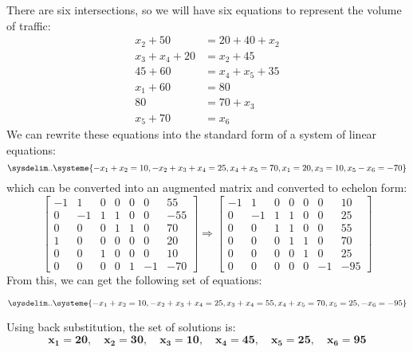 \documentclass[12pt]{article}
\begin{document}
\begin{solution}
There are six intersections, so we will have six equations to represent the volume of traffic:
\begin{align*}
x_2 + 50 &= 20 + 40 + x_2 \\
x_3 + x_4 + 20 &= x_2 + 45 \\
45 + 60 &= x_4 + x_5 + 35 \\
x_1 + 60 &= 80 \\
80 &= 70 + x_3 \\ 
x_5 + 70 &= x_6
\end{align*}
We can rewrite these equations into the standard form of a system of linear equations:
$$\sysdelim..\systeme{
  -x_1  + x_2                         = 10,
         -x_2 + x_3 + x_4             = 25,
                      x_4 + x_5       = 70,
   x_1                                = 20,
                x_3                   = 10,
                            x_5 - x_6 = -70
}$$
which can be converted into an augmented matrix and converted to echelon form:
$$\begin{bmatrix} -1 & 1 & 0 & 0 & 0 & 0 & 55 \\ 
				   0 & -1 & 1 & 1 & 0 & 0 & -55\\ 
				   0 & 0 & 0 & 1 & 1 & 0 & 70 \\
				   1 & 0 & 0 & 0 & 0 & 0 & 20 \\
				   0 & 0 & 1 & 0 & 0 & 0 & 10 \\
				   0 & 0 & 0 & 0 & 1 & -1 & -70
				   \end{bmatrix} \Rightarrow 
\begin{bmatrix}   -1 & 1 & 0 & 0 & 0 & 0 & 10 \\ 
				   0 & -1 & 1 & 1 & 0 & 0 & 25\\ 
				   0 & 0 & 1 & 1 & 0 & 0 & 55 \\
				   0 & 0 & 0 & 1 & 1 & 0 & 70 \\
				   0 & 0 & 0 & 0 & 1 & 0 & 25 \\
				   0 & 0 & 0 & 0 & 0 & -1 & -95
				   \end{bmatrix} $$
From this, we can get the following set of equations:

$$\sysdelim..\systeme{
  -x_1  + x_2                         = 10,
         -x_2 + x_3 + x_4             = 25,
                x_3 + x_4             = 55,
                      x_4 + x_5       = 70,
                            x_5       = 25,
                                 -x_6 = -95
}$$


Using back substitution, the set of solutions is: $$\mathbf{x_1 = 20, \quad x_2 = 30, \quad x_3 = 10, \quad x_4 = 45, \quad x_5 = 25, \quad x_6 = 95}$$
\end{solution}
\end{document}
